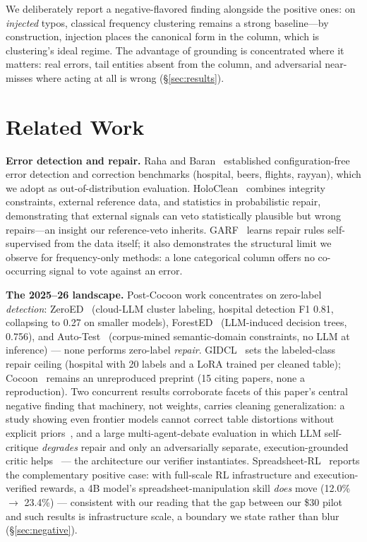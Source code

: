 \documentclass[11pt]{article}
\begin{document}
We deliberately report a negative-flavored finding alongside the positive ones: on
\emph{injected} typos, classical frequency clustering remains a strong baseline---by
construction, injection places the canonical form in the column, which is clustering's
ideal regime. The advantage of grounding is concentrated where it matters: real errors,
tail entities absent from the column, and adversarial near-misses where acting at all is
wrong (\S\ref{sec:results}).

\section{Related Work}
\label{sec:related}

\textbf{Error detection and repair.} Raha and Baran~\cite{raha} established
configuration-free error detection and correction benchmarks (hospital, beers, flights,
rayyan), which we adopt as out-of-distribution evaluation. HoloClean~\cite{holoclean}
combines integrity constraints, external reference data, and statistics in probabilistic
repair, demonstrating that external signals can veto statistically plausible but wrong
repairs---an insight our reference-veto inherits. GARF~\cite{garf} learns repair rules
self-supervised from the data itself; it also demonstrates the structural limit we
observe for frequency-only methods: a lone categorical column offers no co-occurring
signal to vote against an error.

\textbf{The 2025--26 landscape.} Post-Cocoon work concentrates on zero-label
\emph{detection}: ZeroED~\cite{zeroed} (cloud-LLM cluster labeling, hospital
detection F1 0.81, collapsing to 0.27 on smaller models), ForestED~\cite{forested}
(LLM-induced decision trees, 0.756), and Auto-Test~\cite{autotest} (corpus-mined
semantic-domain constraints, no LLM at inference) --- none performs zero-label
\emph{repair}. GIDCL~\cite{gidcl} sets the labeled-class repair ceiling
(hospital \gidclHosp{} with 20 labels and a LoRA trained per cleaned table);
Cocoon~\cite{cocoon} remains an unreproduced preprint (15 citing papers, none a
reproduction). Two concurrent results corroborate facets of this paper's central
negative finding that machinery, not weights, carries cleaning generalization: a
study showing even frontier models cannot correct table distortions without
explicit priors~\cite{distort}, and a large multi-agent-debate evaluation in which
LLM self-critique \emph{degrades} repair and only an adversarially separate,
execution-grounded critic helps~\cite{debate} --- the architecture our verifier
instantiates. Spreadsheet-RL~\cite{spreadsheetrl} reports the complementary
positive case: with full-scale RL infrastructure and execution-verified rewards,
a 4B model's spreadsheet-manipulation skill \emph{does} move (12.0\%
$\rightarrow$ 23.4\%) --- consistent with our reading that the gap between our
\$30 pilot and such results is infrastructure scale, a boundary we state rather
than blur (\S\ref{sec:negative}).
\end{document}
